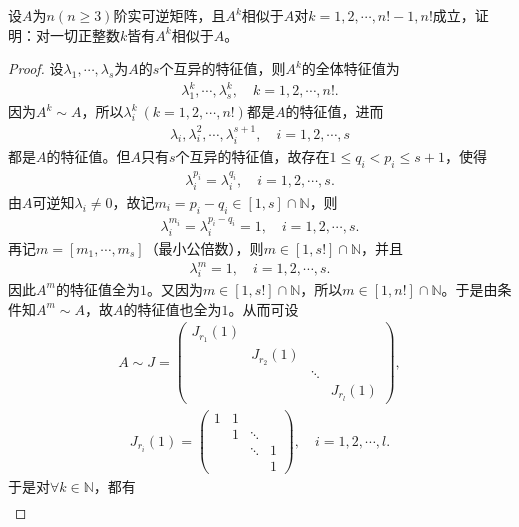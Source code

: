 \documentclass[../../main.tex]{subfiles}%
\begin{document}
\begin{example}
设$A$为$n(n \geqslant 3)$阶实可逆矩阵，且$A^k$相似于$A$对$k = 1,2,\cdots,n!-1,n!$成立，证明：对一切正整数$k$皆有$A^k$相似于$A$。
\end{example}
\begin{proof}

设$\lambda_1,\cdots,\lambda_s$为$A$的$s$个互异的特征值，则$A^k$的全体特征值为
\begin{align*}
\lambda_1^k,\cdots,\lambda_s^k,\quad k=1,2,\cdots,n!.
\end{align*}
因为$A^k\sim A$，所以$\lambda_i^k\ (k=1,2,\cdots,n!)$都是$A$的特征值，进而
\begin{align*}
\lambda_i,\lambda_i^2,\cdots,\lambda_i^{s+1},\quad i=1,2,\cdots,s
\end{align*}
都是$A$的特征值。但$A$只有$s$个互异的特征值，故存在$1\leqslant q_i<p_i\leqslant s+1$，使得
\begin{align*}
\lambda_i^{p_i}=\lambda_i^{q_i},\quad i=1,2,\cdots,s.
\end{align*}
由$A$可逆知$\lambda_i\ne 0$，故记$m_i=p_i-q_i\in [1,s]\cap\mathbb{N}$，则
\begin{align*}
\lambda_i^{m_i}=\lambda_i^{p_i-q_i}=1,\quad i=1,2,\cdots,s.
\end{align*}
再记$m=[m_1,\cdots,m_s]$（最小公倍数），则$m\in [1,s!]\cap\mathbb{N}$，并且
\begin{align*}
\lambda_i^m=1,\quad i=1,2,\cdots,s.
\end{align*}
因此$A^m$的特征值全为$1$。又因为$m\in [1,s!]\cap\mathbb{N}$，所以$m\in [1,n!]\cap\mathbb{N}$。于是由条件知$A^m\sim A$，故$A$的特征值也全为$1$。从而可设
\begin{align*}
A\sim J=\begin{pmatrix}
J_{r_1}(1) & & & \\
& J_{r_2}(1) & & \\
& & \ddots & \\
& & & J_{r_l}(1)
\end{pmatrix},
\end{align*}
\begin{align*}
J_{r_i}(1)=\begin{pmatrix}
1 & 1 & & \\
& 1 & \ddots & \\
& & \ddots & 1 \\
& & & 1
\end{pmatrix},\quad i=1,2,\cdots,l.
\end{align*}
于是对$\forall k\in\mathbb{N}$，都有
\begin{align*}

\end{align*}
\end{proof}
\end{document}
